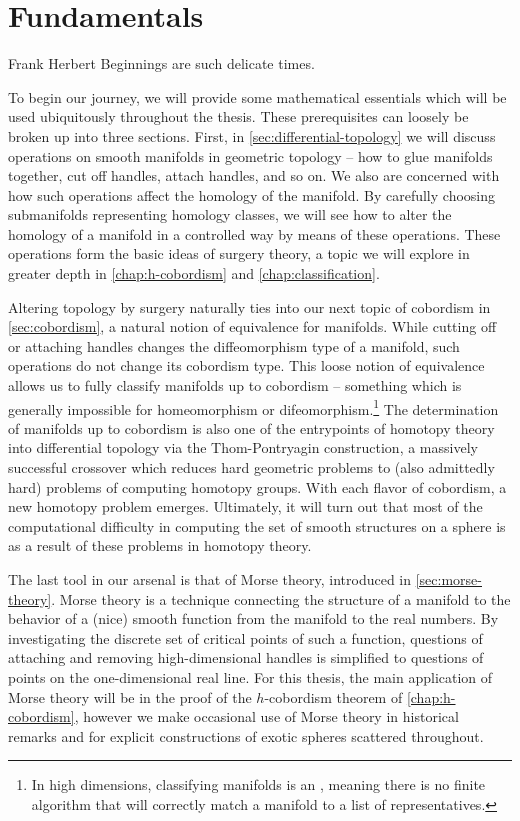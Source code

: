 \chapter{Fundamentals}\label{chap:fundamentals}

\begin{epigraph}{16em}{Frank Herbert}
  Beginnings are such delicate times.
\end{epigraph}

To begin our journey, we will provide some mathematical essentials which will be used ubiquitously throughout the thesis. These prerequisites can loosely be broken up into three sections. First, in \cref{sec:differential-topology} we will discuss operations on smooth manifolds in geometric topology -- how to glue manifolds together, cut off handles, attach handles, and so on. We also are concerned with how such operations affect the homology of the manifold. By carefully choosing submanifolds representing homology classes, we will see how to alter the homology of a manifold in a controlled way by means of these operations. These operations form the basic ideas of surgery theory, a topic we will explore in greater depth in \cref{chap:h-cobordism} and \cref{chap:classification}.

Altering topology by surgery naturally ties into our next topic of cobordism in \cref{sec:cobordism}, a natural notion of equivalence for manifolds. While cutting off or attaching handles changes the diffeomorphism type of a manifold, such operations do not change its cobordism type. This loose notion of equivalence allows us to fully classify manifolds up to cobordism -- something which is generally impossible for homeomorphism or difeomorphism.\footnote{In high dimensions, classifying manifolds is an , meaning there is no finite algorithm that will correctly match a manifold to a list of representatives.}
The determination of manifolds up to cobordism is also one of the entrypoints of homotopy theory into differential topology via the Thom-Pontryagin construction, a massively successful crossover which reduces hard geometric problems to (also admittedly hard) problems of computing homotopy groups. With each flavor of cobordism, a new homotopy problem emerges. Ultimately, it will turn out that most of the computational difficulty in computing the set of smooth structures on a sphere is as a result of these problems in homotopy theory.

The last tool in our arsenal is that of Morse theory, introduced in \cref{sec:morse-theory}. Morse theory is a technique connecting the structure of a manifold to the behavior of a (nice) smooth function from the manifold to the real numbers. By investigating the discrete set of critical points of such a function, questions of attaching and removing high-dimensional handles is simplified to questions of points on the one-dimensional real line. For this thesis, the main application of Morse theory will be in the proof of the $h$-cobordism theorem of \cref{chap:h-cobordism}, however we make occasional use of Morse theory in historical remarks and for explicit constructions of exotic spheres scattered throughout.

